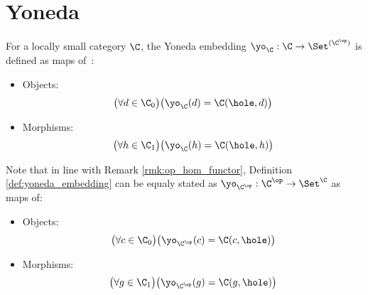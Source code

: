 \section{Yoneda}

\begin{definition}\label{def:yoneda_embedding}

  For a locally small category $\C$, the Yoneda embedding $\yo_\C:\C \to
  \Set^{(\C^\op)}$ is defined as maps
  of~\parencite[p.~90]{leinster:basic_category_theory}:

  \begin{itemize}
    \item Objects:
      \[\big(\forall d\in \C_0\big)
        \big(\yo_\C(d) = \C(\hole, d) \big)\]
    \item Morphisms:
      \[\big(\forall h\in \C_1\big)
        \big(\yo_\C(h) = \C(\hole, h) \big)\]
  \end{itemize}
\end{definition}

\begin{remark}
  Note that in line with Remark \ref{rmk:op_hom_functor}, Definition
  \ref{def:yoneda_embedding} can be equaly stated as $\yo_{\C^\op}: \C^\op \to\Set^\C$ as maps of:
  \begin{itemize}
    \item Objects:
      \[\big(\forall c\in \C_0\big)
        \big(\yo_{\C^\op}(c) = \C(c, \hole)\big)\]
    \item Morphisms:
      \[\big(\forall g\in \C_1\big)
        \big(\yo_{\C^\op}(g) = \C(g, \hole)\big)\]
  \end{itemize}
\end{remark}

